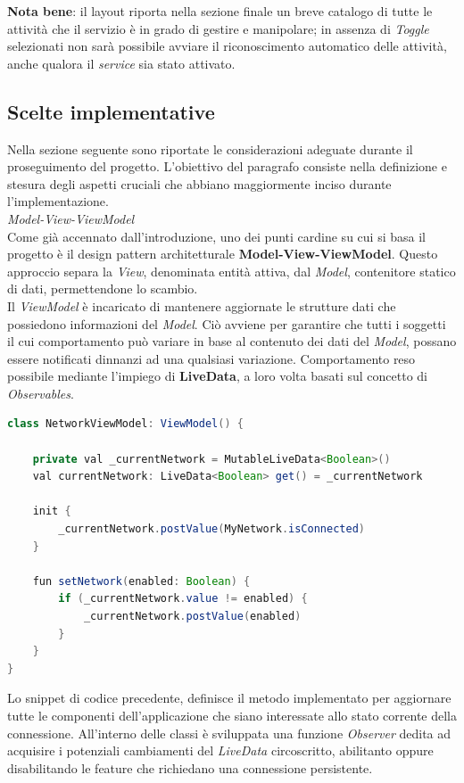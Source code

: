\documentclass{article}
\begin{document}
    \textbf{Nota bene}: il layout riporta nella sezione finale un breve catalogo di tutte le attività che il servizio è in grado di gestire e manipolare; in assenza di \textit{Toggle} selezionati non sarà possibile avviare il riconoscimento automatico delle attività, anche qualora il \textit{service} sia stato attivato.

    \newpage
    \subsection*{Scelte implementative}
    Nella sezione seguente sono riportate le considerazioni adeguate durante il proseguimento del progetto. L'obiettivo del paragrafo consiste nella definizione e stesura degli aspetti cruciali che abbiano maggiormente inciso durante l'implementazione. \vspace{7pt}\\
    \textit{Model-View-ViewModel} \vspace{7pt}\\
    Come già accennato dall'introduzione, uno dei punti cardine su cui si basa il progetto è il design pattern architetturale \textbf{Model-View-ViewModel}.
    Questo approccio separa la \textit{View}, denominata entità attiva, dal \textit{Model}, contenitore statico di dati, permettendone lo scambio. \\
    Il \textit{ViewModel} è incaricato di mantenere aggiornate le strutture dati che possiedono informazioni del \textit{Model}. Ciò avviene per garantire che tutti i soggetti il cui comportamento può variare in base al contenuto dei dati del \textit{Model}, possano essere notificati dinnanzi ad una qualsiasi variazione.
    Comportamento reso possibile mediante l'impiego di \textbf{LiveData}, a loro volta basati sul concetto di \textit{Observables}.
    \begin{lstlisting}[language=Java]
class NetworkViewModel: ViewModel() {

    private val _currentNetwork = MutableLiveData<Boolean>()
    val currentNetwork: LiveData<Boolean> get() = _currentNetwork

    init {
        _currentNetwork.postValue(MyNetwork.isConnected)
    }

    fun setNetwork(enabled: Boolean) {
        if (_currentNetwork.value != enabled) {
            _currentNetwork.postValue(enabled)
        }
    }
}
    \end{lstlisting}
    Lo snippet di codice precedente, definisce il metodo implementato per aggiornare tutte le componenti dell'applicazione che siano interessate allo stato corrente della connessione. All'interno delle classi è sviluppata una funzione \textit{Observer} dedita ad acquisire i potenziali cambiamenti del \textit{LiveData} circoscritto, abilitanto oppure disabilitando le feature che richiedano una connessione persistente. \vspace{7pt}\\
\end{document}
